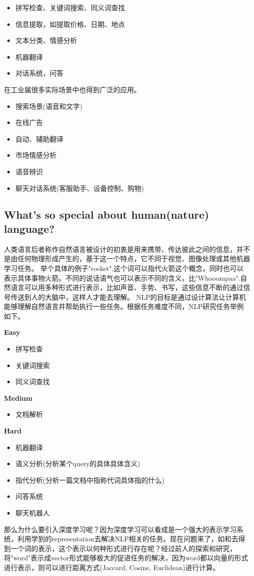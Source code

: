 \documentclass[twoside,nofonts,fancyhdr,openany,UTF8]{ctexbook}
\begin{document}
\begin{itemize}
\item 拼写检查、关键词搜索、同义词查找
\item 信息提取，如提取价格、日期、地点
\item 文本分类、情感分析
\item 机器翻译
\item 对话系统，问答
\end{itemize}
在工业届很多实际场景中也得到广泛的应用。
\begin{itemize}
\item 搜索场景(语音和文字)
\item 在线广告
\item 自动、辅助翻译
\item 市场情感分析
\item 语音辨识
\item 聊天对话系统(客服助手、设备控制、购物)
\end{itemize}

\subsection{What's so special about human(nature) language?}
人类语言后者称作自然语言被设计的初衷是用来携带、传达彼此之间的信息，并不是由任何物理形成产生的，基于这一个特点，它不同于视觉、图像处理或其他机器学习任务。
举个具体的例子"rocket",这个词可以指代火箭这个概念，同时也可以表示具体事物火箭。不同的说话语气也可以表示不同的含义，比"Whooompaa".自然语言可以用多种形式进行表示，比如声音、手势、书写，这些信息不断的通过信号传送到人的大脑中，这样人才能去理解。
NLP的目标是通过设计算法让计算机能够理解自然语言并帮助执行一些任务。根据任务难度不同，NLP研究任务举例如下。

\textbf{Easy}
\begin{itemize}
\item 拼写检查
\item 关键词搜索
\item 同义词查找
\end{itemize}

\textbf{Medium}
\begin{itemize}
\item 文档解析
\end{itemize}

\textbf{Hard}
\begin{itemize}
\item 机器翻译
\item 语义分析(分析某个query的具体具体含义)
\item 指代分析(分析一篇文档中指称代词具体指的什么)
\item 问答系统
\item 聊天机器人
\end{itemize}
那么为什么要引入深度学习呢？因为深度学习可以看成是一个强大的表示学习系统，利用学到的representation去解决NLP相关的任务。现在问题来了，如和去得到一个词的表示，这个表示以何种形式进行存在呢？经过前人的探索和研究，将"word"表示成vector形式能够极大的促进任务的解决，因为word都以向量的形式进行表示，则可以进行距离方式(Jaccard, Cosine, Euclidean)进行计算。
\end{document}
